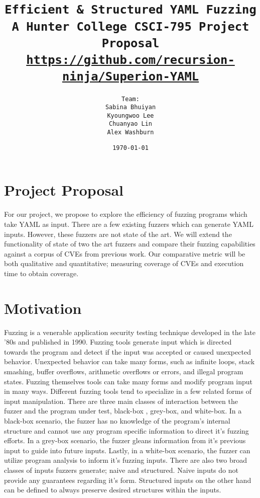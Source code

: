 \documentclass[12pt]{diazessay}
\title{\texttt{\huge{Efficient \& Structured YAML Fuzzing} \\\vspace{-0.65cm} {\large A Hunter College CSCI-795 Project Proposal}\\\normalsize\url{https://github.com/recursion-ninja/Superion-YAML}}} %
\author{\texttt{{\Huge Team:}\\\vspace*{-0.5em} 
		Sabina Bhuiyan \\\vspace*{-0.5em} 
		Kyoungwoo Lee \\\vspace*{-0.5em}
		Chuanyao Lin \\\vspace*{-0.25em}
		Alex Washburn}} %
\date{\texttt{\today}} %
\begin{document}
\maketitle %

\vspace{-2cm}
\section*{Project Proposal}

For our project, we propose to explore the efficiency of fuzzing programs which take YAML\cite{YAMLdraft} as input.
There are a few existing fuzzers which can generate YAML inputs.
However, these fuzzers are not state of the art.
We will extend the functionality of state of two the art fuzzers and compare their fuzzing capabilities against a corpus of CVEs from previous work.
Our comparative metric will be both qualitative and quantitative; measuring coverage of CVEs and execution time to obtain coverage.

\section*{Motivation}

Fuzzing is a venerable application security testing technique developed in the late '80s\cite{Barton1988} and published in 1990\cite{Miller1990}.
Fuzzing tools generate input which is directed towards the program and detect if the input was accepted or caused unexpected behavior.
Unexpected behavior can take many forms, such as infinite loops, stack smashing, buffer overflows, arithmetic overflows or errors, and illegal program states.
Fuzzing themselves tools can take many forms\cite{ModelBasedFuzzing}\cite{GrammarBasedFuzzing}\cite{ProtocolBasedFuzzing} and modify program input in many ways.
Different fuzzing tools tend to specialize in a few related forms of input\cite{InputDiversity} manipulation.
There are three main classes of interaction between the fuzzer and the program under test, black-box \cite{takanen2018fuzzing}, grey-box, and white-box.
In a black-box scenario, the fuzzer has no knowledge of the program's internal structure and cannot use any program specific information to direct it's fuzzing efforts.
In a grey-box scenario, the fuzzer gleans information from it's previous input to guide into future inputs.
Lastly, in a white-box scenario, the fuzzer can utilize program analysis to inform it's fuzzing inputs.
There are also two broad classes of inputs fuzzers generate; naive and structured.
Naive inputs do not provide any guarantees regarding it's form.
Structured inputs on the other hand can be defined to always preserve desired structures within the inputs.
\end{document}

